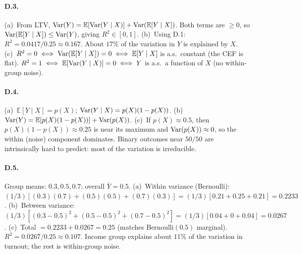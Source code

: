 \documentclass{article}
\newcommand{\E}{\mathbb{E}}
\begin{document}
\paragraph{D.3.}  (a)~From LTV, $\Var(Y) = \E[\Var(Y\mid X)] + \Var(\E[Y\mid X])$.  Both terms are $\geq 0$, so $\Var(\E[Y\mid X]) \leq \Var(Y)$, giving $R^2 \in [0,1]$.  (b)~Using D.1: $R^2 = 0.0417 / 0.25 \approx 0.167$.  About $17\%$ of the variation in $Y$ is explained by $X$.  (c)~$R^2 = 0 \iff \Var(\E[Y\mid X]) = 0 \iff \E[Y\mid X]$ is a.s.\ constant (the CEF is flat).  $R^2 = 1 \iff \E[\Var(Y\mid X)] = 0 \iff Y$ is a.s.\ a function of $X$ (no within-group noise).

\paragraph{D.4.}  (a)~$\E[Y\mid X] = p(X)$; $\mbox{Var}(Y \mid X) = p(X)(1 - p(X))$.  (b)~$\Var(Y) = \E[p(X)(1-p(X))] + \Var(p(X))$.  (c)~If $p(X) \approx 0.5$, then $p(X)(1 - p(X)) \approx 0.25$ is near its maximum and $\mbox{Var}(p(X)) \approx 0$, so the within (noise) component dominates.  Binary outcomes near $50/50$ are intrinsically hard to predict: most of the variation is irreducible.

\paragraph{D.5.}  Group means: $0.3, 0.5, 0.7$; overall $\bar Y = 0.5$.  (a)~Within variance (Bernoulli): $(1/3)[(0.3)(0.7) + (0.5)(0.5) + (0.7)(0.3)] = (1/3)[0.21 + 0.25 + 0.21] = 0.2233$.  (b)~Between variance: $(1/3)[(0.3 - 0.5)^2 + (0.5 - 0.5)^2 + (0.7 - 0.5)^2] = (1/3)[0.04 + 0 + 0.04] = 0.0267$.  (c)~Total $= 0.2233 + 0.0267 = 0.25$ (matches Bernoulli$(0.5)$ marginal).  $R^2 = 0.0267/0.25 \approx 0.107$.  Income group explains about $11\%$ of the variation in turnout; the rest is within-group noise.
\end{document}
